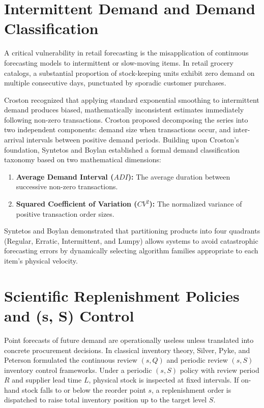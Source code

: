 \section{Intermittent Demand and Demand Classification}
A critical vulnerability in retail forecasting is the misapplication of continuous forecasting models to intermittent or slow-moving items. In retail grocery catalogs, a substantial proportion of stock-keeping units exhibit zero demand on multiple consecutive days, punctuated by sporadic customer purchases. 

Croston \cite{4} recognized that applying standard exponential smoothing to intermittent demand produces biased, mathematically inconsistent estimates immediately following non-zero transactions. Croston proposed decomposing the series into two independent components: demand size when transactions occur, and inter-arrival intervals between positive demand periods. Building upon Croston's foundation, Syntetos and Boylan \cite{1} established a formal demand classification taxonomy based on two mathematical dimensions:
\begin{enumerate}
    \item \textbf{Average Demand Interval ($ADI$):} The average duration between successive non-zero transactions.
    \item \textbf{Squared Coefficient of Variation ($CV^2$):} The normalized variance of positive transaction order sizes.
\end{enumerate}
Syntetos and Boylan demonstrated that partitioning products into four quadrants (Regular, Erratic, Intermittent, and Lumpy) allows systems to avoid catastrophic forecasting errors by dynamically selecting algorithm families appropriate to each item's physical velocity.

\section{Scientific Replenishment Policies and (s, S) Control}
Point forecasts of future demand are operationally useless unless translated into concrete procurement decisions. In classical inventory theory, Silver, Pyke, and Peterson \cite{7} formulated the continuous review $(s, Q)$ and periodic review $(s, S)$ inventory control frameworks. Under a periodic $(s, S)$ policy with review period $R$ and supplier lead time $L$, physical stock is inspected at fixed intervals. If on-hand stock falls to or below the reorder point $s$, a replenishment order is dispatched to raise total inventory position up to the target level $S$.

